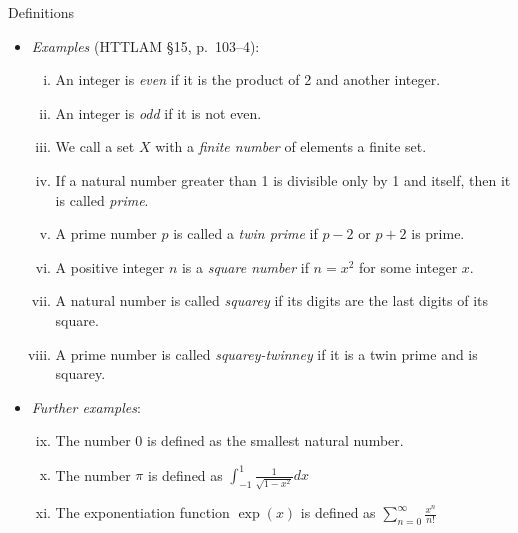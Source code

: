 \documentclass[../slides.tex]{subfiles}
\begin{document}
\begin{frame}{Definitions}

	\begin{itemize}
		
		\item \emph{Examples} (HTTLAM \S15, p.~103--4):
	
	\begin{enumerate}[(i)]
	
		\item An integer is \emph{even} if it is the product of 2 and another integer.
		
		\item An integer is \emph{odd} if it is not even.
		
		\item We call a set $X$ with a \emph{finite number} of elements a finite set.
		
		\item If a natural number greater than 1 is divisible only by 1 and itself, then it is called \emph{prime}.
		
		\item A prime number $p$ is called a \emph{twin prime} if $p-2$ or $p+2$ is prime.
		
		\item A positive integer $n$ is a \emph{square number} if $n= x^2$ for some integer $x$.
		
		\item A natural number is called \emph{squarey} if its digits are the last digits of its square.
		
		\item A prime number is called \emph{squarey-twinney} if it is a twin prime and is squarey.
	
	\end{enumerate}
	
	\item \emph{Further examples}:
	
		\begin{enumerate}[(i)]
		\setcounter{enumi}{8}
		
			\item The number $0$ is defined as the smallest natural number.
		
			\item The number $\pi$ is defined as $\int_{-1}^{1}\frac{1}{\sqrt{1-x^2}}dx$
			
			\item The exponentiation function $\exp(x)$ is defined as $\sum_{n=0}^\infty\frac{x^n}{n!}$
		
		\end{enumerate}
	
	\end{itemize}

\end{frame}
\end{document}
